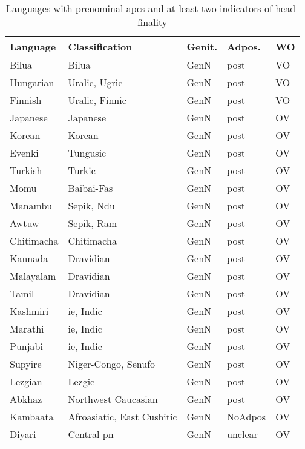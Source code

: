 \documentclass[A4paper]{article}
\begin{document}
\begin{table}[htb!]
\caption{Languages with prenominal \glspl{apc} and at least two indicators of head-finality\label{table:PronN-headfin}}
\centering
 \begin{tabular}{lllll}
    \textbf{Language}  & \textbf{Classification}         & \textbf{Genit.} 	& \textbf{Adpos.}	& \textbf{WO} \\
    \midrule
  Bilua & Bilua & GenN & post & VO 			\\ 
  Hungarian & Uralic, Ugric & GenN & post & VO 		\\ 
  Finnish & Uralic, Finnic & GenN & post & VO 		\\ 
  Japanese & Japanese & GenN & post & OV 		\\ 
  Korean & Korean & GenN & post & OV 			\\ 
  Evenki & Tungusic & GenN & post & OV 			\\ 
  Turkish & Turkic & GenN & post & OV 			\\ 
  Momu & Baibai-Fas & GenN & post & OV 			\\ 
  Manambu & Sepik, Ndu & GenN & post & OV 		\\ 
  Awtuw & Sepik, Ram & GenN & post & OV 		\\ 
  Chitimacha & Chitimacha & GenN & post & OV 		\\ 
  Kannada & Dravidian & GenN & post & OV 		\\ 
  Malayalam & Dravidian & GenN & post & OV 		\\ 
  Tamil & Dravidian & GenN & post & OV 			\\ 
  Kashmiri & \gls{ie}, Indic & GenN & post & OV 	\\ 
  Marathi & \gls{ie}, Indic & GenN & post & OV 		\\ 
  Punjabi & \gls{ie}, Indic & GenN & post & OV 		\\ 
  Supyire & Niger-Congo, Senufo & GenN & post & OV 	\\ 
  Lezgian & Lezgic & GenN & post & OV 			\\ 
  Abkhaz & Northwest Caucasian & GenN & post & OV 		\\ 
  Kambaata & Afroasiatic, East Cushitic & GenN & NoAdpos & OV \\ 
  Diyari & Central \gls{pn} & GenN & unclear & OV \\ 

    \end{tabular} 
\end{table}

\clearpage
\end{document}
